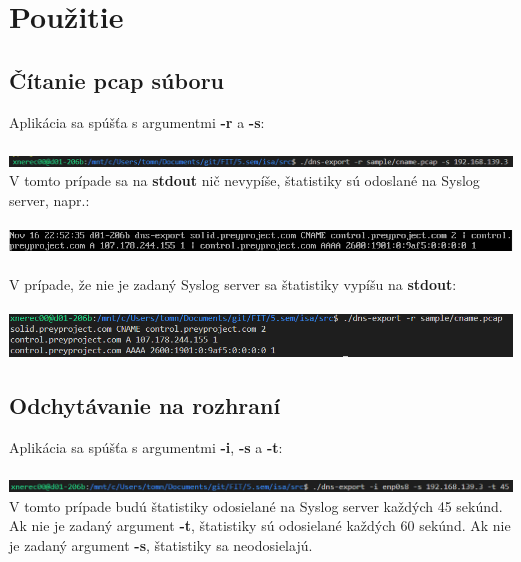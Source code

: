 \documentclass{article}
\begin{document}
        \newpage
        
    \section{Použitie}
        \subsection{Čítanie pcap súboru}
        \noindent
        Aplikácia sa spúšťa s argumentmi \textbf{-r} a \textbf{-s}:\\\\
        \includegraphics[scale=0.6]{r1.png}
        V tomto prípade sa na \textbf{stdout} nič nevypíše, štatistiky sú odoslané na Syslog server, napr.:\\\\
        \includegraphics[scale=0.6]{r2.png}\\\\
        V prípade, že nie je zadaný Syslog server sa štatistiky vypíšu na \textbf{stdout}:\\\\
        \includegraphics[scale=0.6]{r3.png}

        \subsection{Odchytávanie na rozhraní}
        \noindent
        Aplikácia sa spúšťa s argumentmi \textbf{-i}, \textbf{-s} a \textbf{-t}:\\\\
        \includegraphics[scale=0.6]{i1.png}
        V tomto prípade budú štatistiky odosielané na Syslog server každých 45 sekúnd. Ak nie je zadaný argument \textbf{-t},
        štatistiky sú odosielané každých 60 sekúnd. Ak nie je zadaný argument \textbf{-s}, štatistiky sa neodosielajú.
\end{document}
